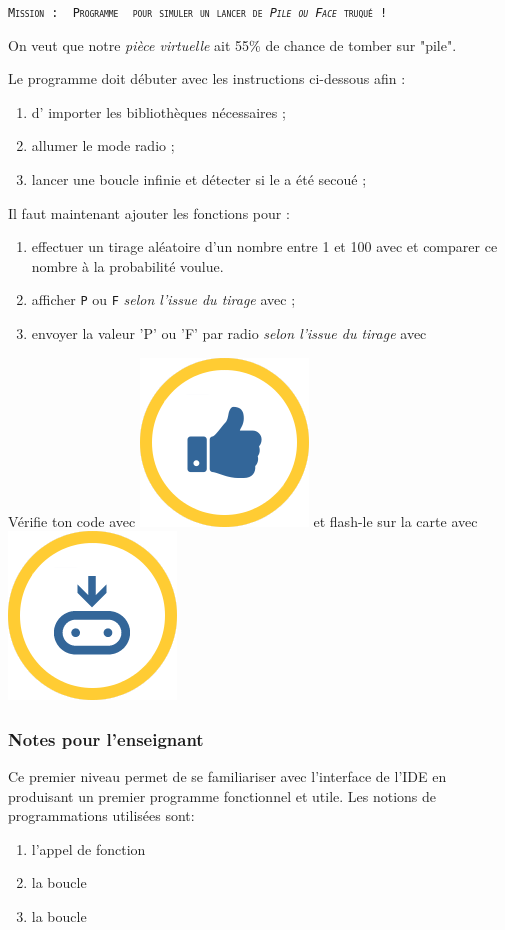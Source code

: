 \begin{eleve}
\texttt{\scshape{Mission : }
Programme \mb~pour simuler un lancer de \emph{Pile ou Face} truqué !}


On veut que notre \emph{pièce virtuelle} ait 55\% de chance de tomber sur "pile".


Le programme doit débuter avec les instructions ci-dessous afin :  
\begin{enumerate}
    \item d' importer les bibliothèques nécessaires ;
    \item allumer le mode radio ;
    \item lancer une boucle infinie et détecter si le \mb a été secoué ;
\end{enumerate}


Il faut maintenant ajouter les fonctions pour : 
\begin{enumerate}
    \item effectuer un tirage aléatoire d'un nombre entre 1 et 100 avec  et comparer ce nombre à la probabilité voulue.
    \item afficher \texttt{P} ou \texttt{F} \emph{selon l'issue du tirage} avec ;
    \item envoyer la valeur 'P' ou 'F' par radio \emph{selon l'issue du tirage} avec 
\end{enumerate}

Vérifie ton code avec   \includegraphics[width=0.1\linewidth]{res/check.png} et flash-le sur la carte avec \includegraphics[width=0.1\linewidth]{res/flash.png}


\end{eleve}


\newpage
\subsubsection{Notes pour l'enseignant}

Ce premier niveau permet de se familiariser avec l’interface de l'IDE en produisant un premier programme fonctionnel et utile.
Les notions de programmations utilisées sont:
\begin{enumerate}
    \item l'appel de fonction
    \item la boucle 
    \item la boucle 
\end{enumerate}


